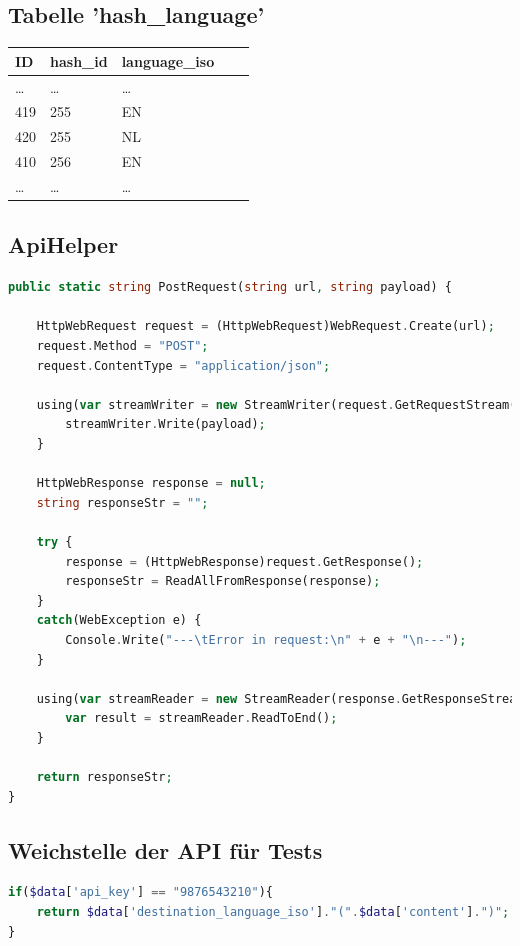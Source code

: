 \subsection{Tabelle 'hash\_language'}
\label{sec:table_hash_language}
\begin{tabular}{ |l|l|l|l|l| }
	\hline
	ID & hash\_id & language\_iso \\ 
	\hline
	\dots & \dots & \dots \\  
	419 & 255 & EN\\  
	420 & 255 & NL\\  
	410 & 256 & EN\\  
	\dots & \dots & \dots \\  
	\hline
\end{tabular}

\newpage
\subsection{ApiHelper}
\label{sec:api_helper}
\begin{lstlisting}[language=php]
public static string PostRequest(string url, string payload) {

    HttpWebRequest request = (HttpWebRequest)WebRequest.Create(url);
    request.Method = "POST";
    request.ContentType = "application/json";

    using(var streamWriter = new StreamWriter(request.GetRequestStream())) {
        streamWriter.Write(payload);
    }

    HttpWebResponse response = null;
    string responseStr = "";

    try {
        response = (HttpWebResponse)request.GetResponse();
        responseStr = ReadAllFromResponse(response);
    }
    catch(WebException e) {
        Console.Write("---\tError in request:\n" + e + "\n---");
    }

    using(var streamReader = new StreamReader(response.GetResponseStream())) {
        var result = streamReader.ReadToEnd();
    }

    return responseStr;
}
\end{lstlisting}

\subsection{Weichstelle der API für Tests}
\label{sec:testing_api}
\begin{lstlisting}[language=php]
if($data['api_key'] == "9876543210"){
    return $data['destination_language_iso']."(".$data['content'].")";
}
\end{lstlisting}